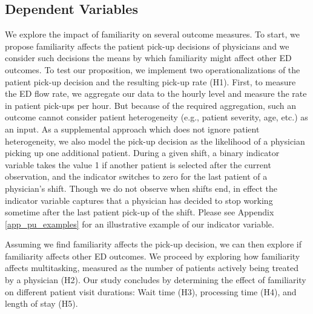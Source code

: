  \subsection{Dependent Variables} \label{emp_DV}
 We explore the impact of familiarity on several outcome measures. To start, we propose familiarity affects the patient pick-up decisions of physicians and we consider such decisions the means by which familiarity might affect other ED outcomes. To test our proposition, we implement two operationalizations of the patient pick-up decision and the resulting pick-up rate (H1). First, to measure the ED flow rate, we aggregate our data to the hourly level and measure the rate in patient pick-ups per hour. But because of the required aggregation, such an outcome cannot consider patient heterogeneity (e.g., patient severity, age, etc.) as an input. As a supplemental approach which does not ignore patient heterogeneity, we also model the pick-up decision as the likelihood of a physician picking up one additional patient. During a given shift, a binary indicator variable takes the value 1 if another patient is selected after the current observation, and the indicator switches to zero for the last patient of a physician's shift. Though we do not observe when shifts end, in effect the indicator variable captures that a physician has decided to stop working sometime after the last patient pick-up of the shift. Please see Appendix \ref{app_pu_examples} for an illustrative example of our indicator variable.

 Assuming we find familiarity affects the pick-up decision, we can then explore if familiarity affects other ED outcomes. We proceed by exploring how familiarity affects multitasking, measured as the number of patients actively being treated by a physician (H2). Our study concludes by determining the effect of familiarity on different patient visit durations: Wait time (H3), processing time (H4), and length of stay (H5).
 
